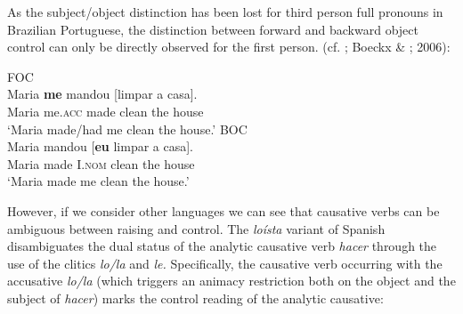 \documentclass[output=paper]{langsci/langscibook}
\begin{document}
As the subject/object distinction has been lost for third person full pronouns in Brazilian Portuguese, the distinction between forward and backward object control can only be directly observed for the first person. (cf. \citealt{Farrell1995}; Boeckx \& \citealt{Hornstein2004}; 2006):

\ea%
    \label{ex:moreno:5}
    \z
\z    



\ea%
    \label{ex:moreno:6}
    \ea  FOC\\
    \gll Maria  \textbf{me}        mandou  [limpar a    casa].      \\
         Maria  me.\textsc{acc} made       clean   the house\\
    \glt ‘Maria made/had me clean the house.’
    \ex  BOC \\
    \gll Maria mandou [\textbf{eu}        limpar a   casa].      \\
         Maria made       I.\textsc{nom}  clean  the house\\
    \glt ‘Maria made me clean the house.’
    \z
\z    

However, if we consider other languages we can see that causative verbs can be ambiguous between raising and control. The \textit{loísta} variant of Spanish disambiguates the dual status of the analytic causative verb \textit{hacer} through the use of the clitics \textit{lo/la} and \textit{le.} Specifically, the causative verb occurring with the accusative \textit{lo/la} (which triggers an animacy restriction both on the object and the subject of \textit{hacer}) marks the control reading of the analytic causative:

\ea%
    \label{ex:moreno:7}
    \z
\z
\end{document}
